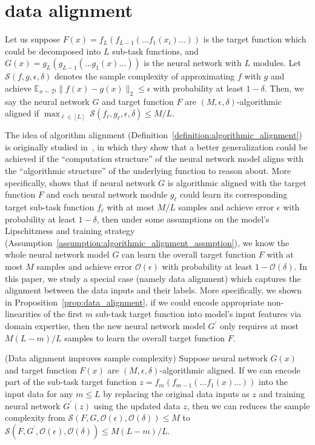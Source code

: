 \section{data alignment}

\begin{definition}  \label{definition:algorithmic_alignment}
Let us suppose $F(x) = f_L(f_{L-1}(\ldots f_1(x_i)\ldots))$ is the target function which could be decomposed into $L$ sub-task functions, and $G(x)= g_L(g_{L-1}(\ldots g_1(x)\ldots))$ is the neural network with $L$ modules.
Let $\mathcal{S}(f, g, \epsilon, \delta)$ denotes the sample complexity of approximating $f$ with $g$ and achieve $\mathbb{E}_{x\sim \mathcal{D}} \| f(x) - g(x) \|_2\leq \epsilon$ with probability at least $1-\delta$.
Then, we say the neural network $G$ and target function $F$ are $(M, \epsilon, \delta)$-algorithmic aligned if $\max_{\ell\in[L]}~\mathcal{S}(f_\ell, g_\ell, \epsilon, \delta) \leq M/L$.
\end{definition}

The idea of algorithm alignment (Definition~\ref{definition:algorithmic_alignment}) is originally studied in~\cite{xu2019can}, in which they show that a better generalization could be achieved if the ``computation structure'' of the neural network model aligns with the ``algorithmic structure'' of the underlying function to reason about. 
More specifically, \cite{xu2019can} shows that if neural network $G$ is algorithmic aligned with the target function $F$ and each neural network module $g_\ell$ could learn its corresponding target sub-task function $f_\ell$ with at most $M/L$ samples and achieve error $\epsilon$ with probability at least $1-\delta$, then under some assumptions on the model's Lipschitzness and training strategy (Assumption~\ref{assumption:algorithmic_alignment_assmption}), we know the whole neural network model $G$ can learn the overall target function $F$ with at most $M$ samples and achieve error $\mathcal{O}(\epsilon)$ with probability at least $1-\mathcal{O}(\delta)$.
In this paper, we study a special case (namely data alignment) which captures the alignment between the data inputs and their labels.
More specifically, we shown in Proposition~\ref{prop:data_alignment}, if we could encode appropriate non-linearities of the first $m$ sub-task target function into model's input features via domain expertise, then the new neural network model $G^\prime$ only requires at most $M(L-m)/L$ samples to learn the overall target function $F$.

\begin{proposition} (Data alignment improves sample complexity) \label{prop:data_alignment}
Suppose neural network $G(x)$ and  target function $F(x)$ are $(M, \epsilon, \delta)$-algorithmic aligned.
If we can encode part of the sub-task target function $z = f_m(f_{m-1}(\ldots f_1(x)\ldots))$ into the input data for any $m\leq L$ by replacing the original data inputs as $z$ and training neural network $G^\prime(z)$ using the updated data $z$, then we can reduces the sample complexity from $\mathcal{S}(F, G, \mathcal{O}(\epsilon), \mathcal{O}(\delta)) \leq M$ to $\mathcal{S}(F, G^\prime, \mathcal{O}(\epsilon), \mathcal{O}(\delta)) \leq M(L-m)/L$.
\end{proposition}


